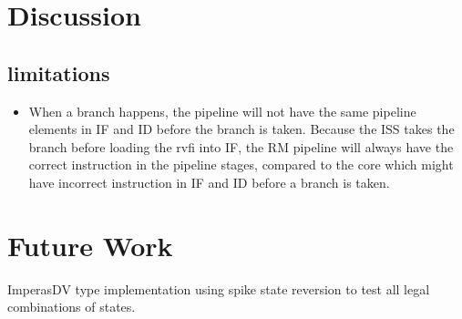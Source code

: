 \chapter{Discussion}




\section{limitations}

\begin{itemize}
    \item When a branch happens, the pipeline will not have the same pipeline elements in IF and ID before the branch is taken. Because the ISS takes the branch before loading the rvfi into IF, the RM pipeline will always have the correct instruction in the pipeline stages, compared to the core which might have incorrect instruction in IF and ID before a branch is taken. 
\end{itemize}


\chapter{Future Work}

ImperasDV type implementation using spike state reversion to test all legal combinations of states.